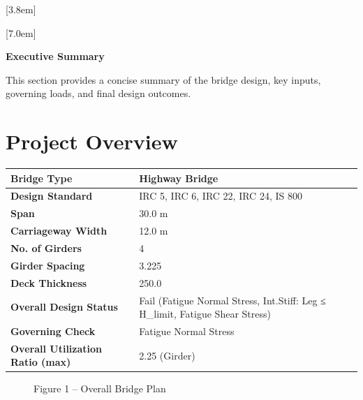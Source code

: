 \documentclass[12pt,a4paper]{report}
\numberwithin{table}{chapter}
\numberwithin{figure}{chapter}
\begin{document}
[3.8em]
  {\normalfont}
  {\contentslabel{2.3em}}
  {\hspace*{-2.3em}}
  {\hfill\contentspage}

[7.0em]
  {\normalfont}
  {\contentslabel{3.2em}}
  {\hspace*{-3.2em}}
  {\hfill\contentspage}

\newpage
\renewcommand{\contentsname}{\centering\Large\bfseries Table of Contents}
\tableofcontents


\newpage
{\centering\Large\bfseries Executive Summary\par}
\vspace{0.8em}

This section provides a concise summary of the bridge design, key inputs, governing loads, and final design outcomes.

\section*{Project Overview}
\label{sec:project-overview}


\begin{tabular}{|L{5.5cm}|L{8.5cm}|}
\hline
\textbf{Bridge Type} & Highway Bridge \\
\hline
\textbf{Design Standard} & IRC 5, IRC 6, IRC 22, IRC 24, IS 800 \\
\hline
\textbf{Span} & 30.0 m \\
\hline
\textbf{Carriageway Width} & 12.0 m \\
\hline
\textbf{No. of Girders} & 4 \\
\hline
\textbf{Girder Spacing} & 3.225 \\
\hline
\textbf{Deck Thickness} & 250.0 \\
\hline
\textbf{Overall Design Status} & Fail (Fatigue Normal Stress, Int.Stiff:\allowbreak{} Leg ≤ H\_\allowbreak{}limit, Fatigue Shear Stress) \\
\hline
\textbf{Governing Check} & Fatigue Normal Stress \\
\hline
\textbf{Overall Utilization Ratio (max)} & 2.25 (Girder) \\
\hline
\end{tabular}


\begin{figure}[H]
\centering
{}
\caption*{Figure 1 -- Overall Bridge Plan}
\end{figure}
\end{document}
